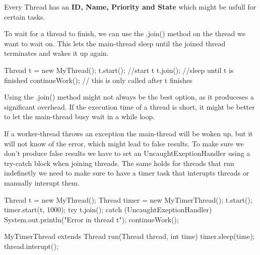 \begin{remark}

                Every Thread has an \textbf{ID, Name, Priority and State} which might be usfull for certain tasks.
            
\end{remark}

            To wait for a thread to finish, we can use the .join() method on the thread we want to wait on. This lets
            the main-thread sleep until the joined thread terminates and wakes it up again.

            \begin{codeexample}

                Thread t = new MyThread();
                t.start(); //start t
                t.join(); //sleep until t is finished
                continueWork(); // this is only called after t finishes
            
\end{codeexample}

\begin{remark}

                Using the .join() method might not always be the best option, as it produceses a significant overhead.
                If the execution time of a thread is short, it might be better to let the main-thread busy wait in a
                while loop.
            
\end{remark}

\begin{important}

                If a worker-thread throws an exception the main-thread will be woken up, but it will not know of the
                error,
                which might lead to false results. To make sure we don't produce false results we have to set an
                UncaughtExeptionHandler using a try-catch block when joining threads. The same holds for threads that
                run indefinetly we need to make sure to have a timer task that interupts threads or manually interupt
                them.
            
\end{important}

\begin{codeexample}

                Thread t = new MyThread();
                Thread timer = new MyTimerThread();
                t.start();
                timer.start(t, 1000);
                try {
                t.join();
                } catch (UncaughtExeptionHandler) {
                System.out.println("Error in thread t");
                }
                continueWork();

                MyTimerThread extends Thread {
                run(Thread thread, int time) {
                timer.sleep(time);
                thread.interupt();
                }
                }
            
\end{codeexample}

